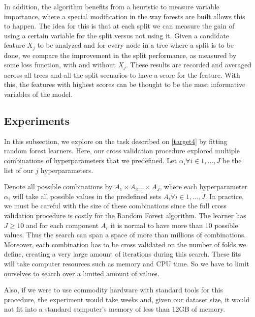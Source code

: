
In addition, the algorithm benefits from a heuristic to measure variable importance, where a special modification in the way forests are built allows this to happen.
The idea for this is that at each split we can measure the gain of using a certain variable for the split versus not using it.
Given a candidate feature $X_j$ to be analyzed and for every node in a tree where a split is to be done, we compare the improvement in the split performance, as measured by some loss function, with and without $X_j$.
These results are recorded and averaged across all trees and all the split scenarios to have a score for the feature.
With this, the features with highest scores can be thought to be the most informative variables of the model.

\subsection{Experiments}\label{subsection:random_forests_experiments}

In this subsection, we explore on the task described on \cref{target4} by fitting random forest learners.
Here, our cross validation procedure explored multiple combinations of hyperparameters that we predefined.
Let $\alpha_i \forall i \in {1,\ldots,J}$ be the list of our $j$ hyperparameters.

Denote all possible combinations by $A_1 \times A_2 \ldots \times  A_J$, where each hyperparameter $\alpha_i$ will take all possible values in the predefined sets $A_i \forall i \in {1,\ldots,J}$.
In practice, we must be careful with the size of these combinations since the full cross validation procedure is costly for the Random Forest algorithm.
The learner has $J \geq 10$ and for each component $A_i$ it is normal to have more than 10 possible values.
Thus the search can span a space of more than millions of combinations.
Moreover, each combination has to be cross validated on the number of folds we define, creating a very large amount of iterations during this search.
These fits will take computer resources such as memory and CPU time.
So we have to limit ourselves to search over a limited amount of values.

Also, if we were to use commodity hardware with standard tools for this procedure, the experiment would take weeks and, given our dataset size, it would not fit into a standard computer's memory of less than 12GB of memory.

